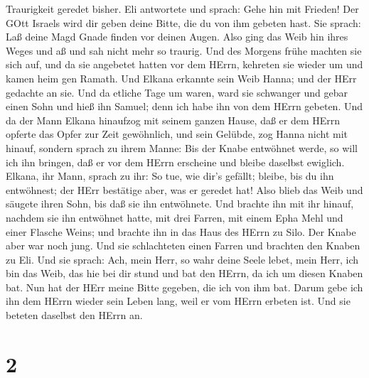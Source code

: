 Traurigkeit geredet bisher.  Eli antwortete und sprach:
Gehe hin mit Frieden! Der GOtt Israels wird dir geben deine Bitte, die
du von ihm gebeten hast.  Sie sprach: Laß deine Magd Gnade
finden vor deinen Augen. Also ging das Weib hin ihres Weges und aß und
sah nicht mehr so traurig.  Und des Morgens frühe machten
sie sich auf, und da sie angebetet hatten vor dem HErrn, kehreten sie
wieder um und kamen heim gen Ramath. Und Elkana erkannte sein Weib
Hanna; und der HErr gedachte an sie.  Und da etliche Tage
um waren, ward sie schwanger und gebar einen Sohn und hieß ihn Samuel;
denn ich habe ihn von dem HErrn gebeten.  Und da der Mann
Elkana hinaufzog mit seinem ganzen Hause, daß er dem HErrn opferte das
Opfer zur Zeit gewöhnlich, und sein Gelübde,  zog Hanna
nicht mit hinauf, sondern sprach zu ihrem Manne: Bis der Knabe entwöhnet
werde, so will ich ihn bringen, daß er vor dem HErrn erscheine und
bleibe daselbst ewiglich.  Elkana, ihr Mann, sprach zu ihr:
So tue, wie dir's gefällt; bleibe, bis du ihn entwöhnest; der HErr
bestätige aber, was er geredet hat! Also blieb das Weib und säugete
ihren Sohn, bis daß sie ihn entwöhnete.  Und brachte ihn
mit ihr hinauf, nachdem sie ihn entwöhnet hatte, mit drei Farren, mit
einem Epha Mehl und einer Flasche Weins; und brachte ihn in das Haus des
HErrn zu Silo. Der Knabe aber war noch jung.  Und sie
schlachteten einen Farren und brachten den Knaben zu Eli. 
Und sie sprach: Ach, mein Herr, so wahr deine Seele lebet, mein Herr,
ich bin das Weib, das hie bei dir stund und bat den HErrn, 
da ich um diesen Knaben bat. Nun hat der HErr meine Bitte gegeben, die
ich von ihm bat.  Darum gebe ich ihn dem HErrn wieder sein
Leben lang, weil er vom HErrn erbeten ist. Und sie beteten daselbst den
HErrn an.

\hypertarget{section-1}{%
\section{2}\label{section-1}}


